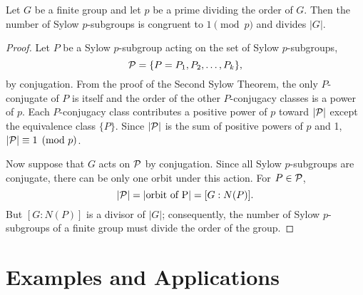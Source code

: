  
\begin{theorem}
Let $G$ be a finite group and let $p$ be a prime dividing the order of
$G$.  Then the number of Sylow $p$-subgroups is congruent to $1
\pmod{p}$ and divides $|G|$. 
\end{theorem}
 
 
\begin{proof}
Let $P$ be a Sylow $p$-subgroup acting on the set of Sylow
$p$-subgroups, 
$$
{\cal P} = \{ P = P_1, P_2, \ldots, P_k \},
$$
by conjugation. From the proof of the Second Sylow Theorem, the only
$P$-conjugate of $P$ is itself and the order of the other
$P$-conjugacy classes is a power of $p$. Each $P$-conjugacy class
contributes a positive power of $p$ toward $|{\cal P}|$ except the
equivalence class  $\{ P \}$. Since $|{\cal P}|$ is the sum of
positive powers of $p$ and 1, $|{\cal P}| \equiv 1 \pmod{p}$.
 
 
Now suppose that $G$ acts on ${\cal P}$ by conjugation. Since all
Sylow $p$-subgroups are conjugate, there can be only one orbit under
this action. For $P \in {\cal P}$, 
$$
|{\cal P}| = |\mbox{orbit of P}| = [G : N(P)].
$$
But $[G : N(P)]$ is a divisor of $|G|$; consequently, the number of
Sylow \mbox{$p$-subgroups} of a finite group must divide the order of the
group. 
\end{proof}
 
 
 
\histhead 
 
 
 
 
 
\section{Examples and Applications}
 
